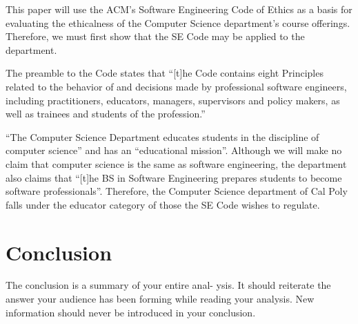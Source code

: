 \documentclass[11pt]{article}
\begin{document}
\begin{multicols}{2}
This paper will use the ACM's Software Engineering Code of Ethics as a basis for evaluating the ethicalness of the Computer Science department's course offerings.  Therefore, we must first show that the SE Code may be applied to the department.

The preamble to the Code states that ``[t]he Code contains eight Principles related to the behavior of and decisions made by professional software engineers, including practitioners, educators, managers, supervisors and policy makers, as well as trainees and students of the profession.'' \cite{secode}


``The Computer Science Department educates students in the discipline of computer science'' and has an ``educational mission''. \cite{catalogDept}  Although we will make no claim that computer science is the same as software engineering, the department also claims that ``[t]he BS in Software Engineering prepares students to become software professionals''. \cite{catalogDept}  Therefore, the Computer Science department of Cal Poly falls under the educator category of those the SE Code wishes to regulate.

\section{Conclusion}
The conclusion is a summary of your entire anal- ysis. It should reiterate the answer your audience has been forming while reading your analysis. New information should never be introduced in your conclusion. \cite{texTemp}

\end{multicols}
\newpage

\nocite{*}




\end{document}
